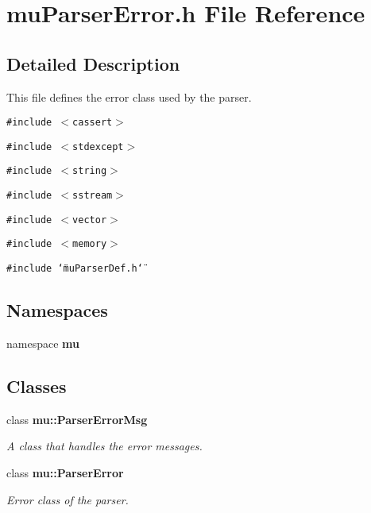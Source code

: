 \section{muParserError.h File Reference}
\label{muParserError_8h}


\subsection{Detailed Description}
This file defines the error class used by the parser. 



{\tt \#include $<$cassert$>$}\par
{\tt \#include $<$stdexcept$>$}\par
{\tt \#include $<$string$>$}\par
{\tt \#include $<$sstream$>$}\par
{\tt \#include $<$vector$>$}\par
{\tt \#include $<$memory$>$}\par
{\tt \#include \char`\"{}muParserDef.h\char`\"{}}\par
\subsection*{Namespaces}
\begin{CompactItemize}
\item 
namespace {\bf mu}
\end{CompactItemize}
\subsection*{Classes}
\begin{CompactItemize}
\item 
class {\bf mu::ParserErrorMsg}
\begin{CompactList}\small\item\em A class that handles the error messages. \item\end{CompactList}\item 
class {\bf mu::ParserError}
\begin{CompactList}\small\item\em Error class of the parser. \item\end{CompactList}\end{CompactItemize}
